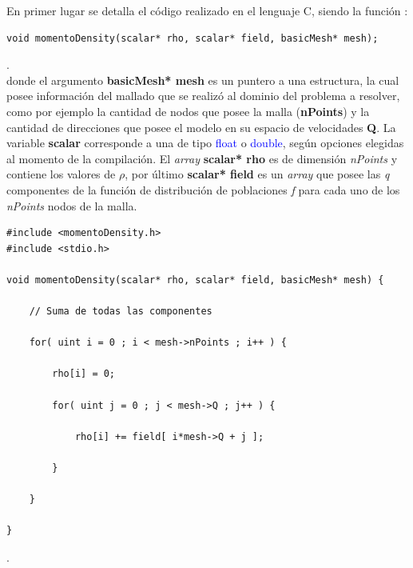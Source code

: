 En primer lugar se detalla el código realizado en el lenguaje \textsc{C}, siendo la función :

{\footnotesize
	\begin{frame}{}
		\begin{lstlisting}
void momentoDensity(scalar* rho, scalar* field, basicMesh* mesh);
		\end{lstlisting}
		
	\end{frame}
}.
\\
donde el argumento \textbf{basicMesh* mesh} es un puntero a una estructura, la cual posee información del mallado que se realizó al dominio del problema a resolver, como por ejemplo la cantidad de nodos que posee la malla (\textbf{nPoints}) y la cantidad de direcciones que posee el modelo en su espacio de velocidades \textbf{Q}. La variable \textbf{scalar} corresponde a una de tipo \textcolor{blue}{float} o \textcolor{blue}{double}, según opciones elegidas al momento de la compilación. El \textit{array}  \textbf{scalar* rho} es de dimensión \textit{nPoints} y contiene los valores de $\rho$, por último \textbf{scalar* field} es un \textit{array} que posee las \textit{q} componentes de la función de distribución de poblaciones \textit{f} para cada uno de los  \textit{nPoints} nodos de la malla.


{\footnotesize
	\begin{frame}{}
		\begin{lstlisting}[frame=single]
#include <momentoDensity.h>
#include <stdio.h>

void momentoDensity(scalar* rho, scalar* field, basicMesh* mesh) {
	
	// Suma de todas las componentes
	
	for( uint i = 0 ; i < mesh->nPoints ; i++ ) {
		
		rho[i] = 0;	    
		
		for( uint j = 0 ; j < mesh->Q ; j++ ) {
		
			rho[i] += field[ i*mesh->Q + j ];
		
		}	
			
	}
	
}
		\end{lstlisting}
		
	\end{frame}
}.
\\


